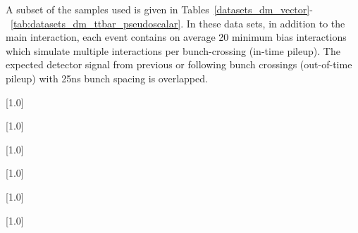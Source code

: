 A subset of the samples used is given in Tables~\ref{datasets_dm_vector}-~\ref{tab:datasets_dm_ttbar_pseudoscalar}. In these data sets, in addition to the main interaction, each
event contains on average 20 minimum bias interactions which simulate multiple interactions per bunch-crossing (in-time pileup). The expected detector signal from previous or following bunch crossings (out-of-time pileup) with 25ns bunch spacing is overlapped.

\begin{table}[!p]
 \centering
{}
 \scriptsize
 \scalebox{.7}[1.0]{}
\label{datasets_dm_vector}
\end{table}

\begin{table}[!p]
 \centering
{}
 \tiny
 \scalebox{.7}[1.0]{}
\label{datasets_dm_axial}
\end{table}

\begin{table}[!p]
 \centering
{}
 \scriptsize
 \scalebox{.7}[1.0]{}
\label{datasets_dm_scalarw}
\end{table}

\begin{table}[!p]
 \centering
{}
 \scriptsize
 \scalebox{.7}[1.0]{}
\label{datasets_dm_pseudoscalar}
\end{table}

\begin{table}[!p]
 \centering
{}
 \scriptsize
 \scalebox{.7}[1.0]{}
\label{datasets_dm_bbar_pseudoscalar}
\end{table}

\begin{table}[!p]
 \centering
{}
 \scriptsize
 \scalebox{.7}[1.0]{}
\label{datasets_dm_bbar_pseudoscalar}
\end{table}

